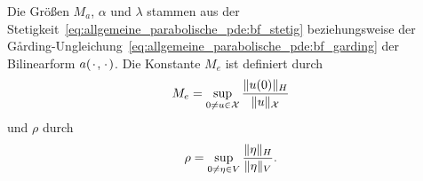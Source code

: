 \begin{Satz}
\begin{Beweis}


    \end{Beweis}
\end{Satz}

Die Größen $M_{a}$, $\alpha$ und $\lambda$ stammen aus der Stetigkeit~\eqref{eq:allgemeine_parabolische_pde:bf_stetig} beziehungsweise der G\r{a}rding-Ungleichung~\eqref{eq:allgemeine_parabolische_pde:bf_garding} der Bilinearform $a({\mkern2mu\cdot\mkern2mu}, {\mkern2mu\cdot\mkern2mu})$.
Die Konstante $M_{e}$ ist definiert durch
\begin{equation}
    \label{eq:var_all_M_e}
    M_{e} = \sup_{0 \neq u \in \mathcal X} \frac{\lVert u(0)\rVert_{H}}{\lVert u\rVert_{\mathcal X}}
\end{equation}
und $\rho$ durch
\begin{equation}
    \label{eq:var_all_rho}
    \rho = \sup_{0 \neq \eta \in V} \frac{\lVert\eta\rVert_{H}}{\lVert\eta\rVert_{V}}.
\end{equation}



